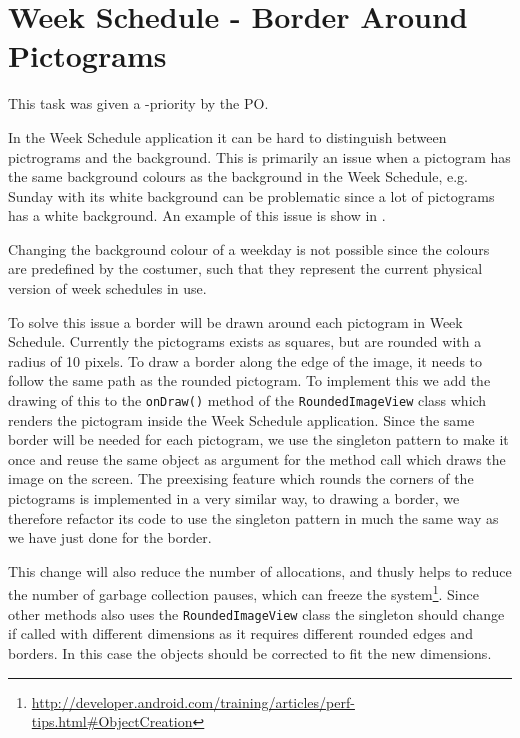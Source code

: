 \section{Week Schedule - Border Around Pictograms}
This task was given a \phigh-priority by the PO. 

In the Week Schedule application it can be hard to distinguish between pictrograms and the background.
This is primarily an issue when a pictogram has the same background colours as the background in the Week Schedule, e.g. Sunday with its white background can be problematic since a lot of pictograms has a white background. 
An example of this issue is show in  .

Changing the background colour of a weekday is not possible since the colours are predefined by the costumer, such that they represent the current physical version of week schedules in use. 

To solve this issue a border will be drawn around each pictogram in Week Schedule.
Currently the pictograms exists as squares, but are rounded with a radius of 10 pixels.
To draw a border along the edge of the image, it needs to follow the same path as the rounded pictogram. 
To implement this we add the drawing of this to the \texttt{onDraw()} method of the \texttt{RoundedImageView} class which renders the pictogram inside the Week Schedule application. 
Since the same border will be needed for each pictogram, we use the singleton pattern to make it once and reuse the same object as argument for the method call which draws the image on the screen. 
The preexising feature which rounds the corners of the pictograms is implemented in a very similar way, to drawing a border, we therefore refactor its code to use the singleton pattern in much the same way as we have just done for the border. 

This change will also reduce the number of allocations, and  thusly helps to reduce the number of garbage collection pauses, which can freeze the system\footnote{\url{http://developer.android.com/training/articles/perf-tips.html\#ObjectCreation}}. 
Since other methods also uses the \texttt{RoundedImageView} class the singleton should change if called with different dimensions as it requires different rounded edges and borders. 
In this case the objects should be corrected to fit the new dimensions. 

